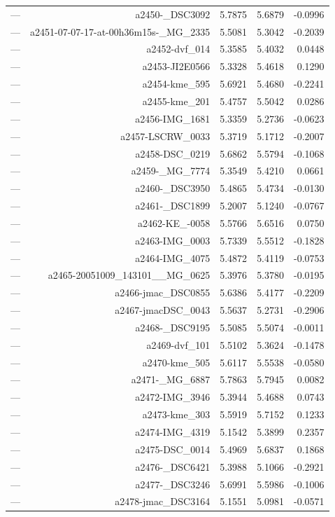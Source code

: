\begin{table}[htbp]
\begin{tabular}{lrrrr}
— & a2450-_DSC3092 & 5.7875 & 5.6879 & -0.0996 \\
— & a2451-07-07-17-at-00h36m15s-_MG_2335 & 5.5081 & 5.3042 & -0.2039 \\
— & a2452-dvf_014 & 5.3585 & 5.4032 & 0.0448 \\
— & a2453-JI2E0566 & 5.3328 & 5.4618 & 0.1290 \\
— & a2454-kme_595 & 5.6921 & 5.4680 & -0.2241 \\
— & a2455-kme_201 & 5.4757 & 5.5042 & 0.0286 \\
— & a2456-IMG_1681 & 5.3359 & 5.2736 & -0.0623 \\
— & a2457-LSCRW_0033 & 5.3719 & 5.1712 & -0.2007 \\
— & a2458-DSC_0219 & 5.6862 & 5.5794 & -0.1068 \\
— & a2459-_MG_7774 & 5.3549 & 5.4210 & 0.0661 \\
— & a2460-_DSC3950 & 5.4865 & 5.4734 & -0.0130 \\
— & a2461-_DSC1899 & 5.2007 & 5.1240 & -0.0767 \\
— & a2462-KE_-0058 & 5.5766 & 5.6516 & 0.0750 \\
— & a2463-IMG_0003 & 5.7339 & 5.5512 & -0.1828 \\
— & a2464-IMG_4075 & 5.4872 & 5.4119 & -0.0753 \\
— & a2465-20051009_143101__MG_0625 & 5.3976 & 5.3780 & -0.0195 \\
— & a2466-jmac_DSC0855 & 5.6386 & 5.4177 & -0.2209 \\
— & a2467-jmacDSC_0043 & 5.5637 & 5.2731 & -0.2906 \\
— & a2468-_DSC9195 & 5.5085 & 5.5074 & -0.0011 \\
— & a2469-dvf_101 & 5.5102 & 5.3624 & -0.1478 \\
— & a2470-kme_505 & 5.6117 & 5.5538 & -0.0580 \\
— & a2471-_MG_6887 & 5.7863 & 5.7945 & 0.0082 \\
— & a2472-IMG_3946 & 5.3944 & 5.4688 & 0.0743 \\
— & a2473-kme_303 & 5.5919 & 5.7152 & 0.1233 \\
— & a2474-IMG_4319 & 5.1542 & 5.3899 & 0.2357 \\
— & a2475-DSC_0014 & 5.4969 & 5.6837 & 0.1868 \\
— & a2476-_DSC6421 & 5.3988 & 5.1066 & -0.2921 \\
— & a2477-_DSC3246 & 5.6991 & 5.5986 & -0.1006 \\
— & a2478-jmac_DSC3164 & 5.1551 & 5.0981 & -0.0571 \\

\end{tabular}
\end{table}
